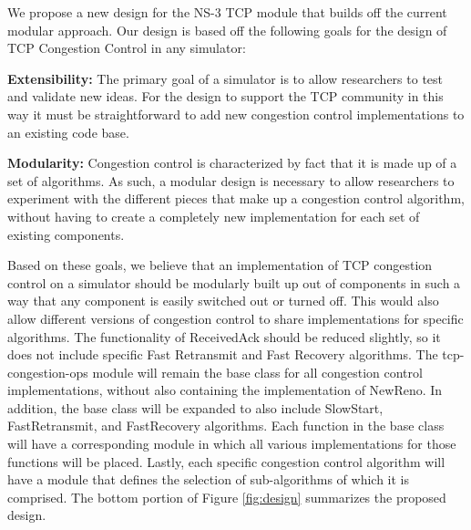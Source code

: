 \documentclass[11pt]{ucthesis}
\begin{document}
We propose a new design for the NS-3 TCP module that builds off the current modular approach. Our design is based off the following goals for the design of TCP Congestion Control in any simulator:

\textbf{Extensibility:} The primary goal of a simulator is to allow researchers to test and validate new ideas. For the design to support the TCP community in this way it must be straightforward to add new congestion control implementations to an existing code base.

\textbf{Modularity:} Congestion control is characterized by fact that it is made up of a set of algorithms. As such, a modular design is necessary to allow researchers to experiment with the different pieces that make up a congestion control algorithm, without having to create a completely new implementation for each set of existing components. 

Based on these goals, we believe that an implementation of TCP congestion control on a simulator should be modularly built up out of components in such a way that any component is easily switched out or turned off. This would also allow different versions of congestion control to share implementations for specific algorithms. The functionality of ReceivedAck should be reduced slightly, so it does not include specific Fast Retransmit and Fast Recovery algorithms. The tcp-congestion-ops module will remain the base class for all congestion control implementations, without also containing the implementation of NewReno. In addition, the base class will be expanded to also include SlowStart, FastRetransmit, and FastRecovery algorithms. Each function in the base class will have a corresponding module in which all various implementations for those functions will be placed. Lastly, each specific congestion control algorithm will have a module that defines the selection of sub-algorithms of which it is comprised. The bottom portion of Figure \ref{fig:design} summarizes the proposed design. 
\end{document}

